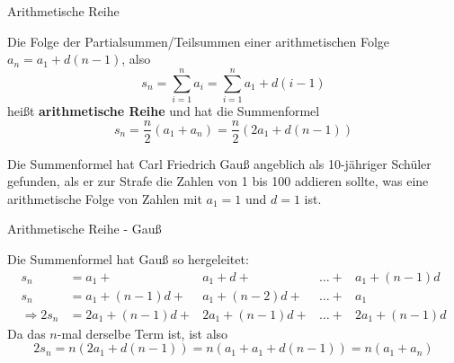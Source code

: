 \begin{frame}{Arithmetische  Reihe}
	\begin{definition}
		Die Folge der Partialsummen/Teilsummen einer arithmetischen Folge $a_{n} = a_{1} + d (n-1)$, also
		\[
			s_{n} = \sum_{i=1}^{n} a_{i} = \sum_{i=1}^{n} a_{1} + d (i-1)
		\]
		heißt \textbf{arithmetische Reihe} und hat die Summenformel
		\[
			s_{n} = \frac{n}{2}	\left( a_{1} + a_{n} \right) = \frac{n}{2} \left( 2 a_{1} + d (n-1)  \right)
		\]
	\end{definition}
	\begin{bemerkung}
		Die Summenformel hat Carl Friedrich Gauß angeblich als 10-jähriger Schüler gefunden, als er zur Strafe die Zahlen von 1 bis 100 addieren sollte, was eine arithmetische Folge von Zahlen mit $a_{1}=1$ und $d=1$ ist.
	\end{bemerkung}
\end{frame}

\begin{frame}{Arithmetische  Reihe - Gauß}
	\begin{example}
		Die Summenformel hat Gauß so hergeleitet:
		\begin{align*}	
			s_{n} & = a_1  +  & a_{1}  + d   + & \ldots  + & a_{1} + (n-1) d \\
			s_{n} & = a_{1} + (n-1) d  + & a_{1} + (n-2)d    + & \ldots  + & a_{1} \\ 
			\hline
			\Rightarrow 2 s_{n} & = 2 a_{1} + (n-1) d + & 2 a_{1} + (n-1) d + & \ldots + & 2 a_{1} + (n-1) d
		\end{align*}
		Da das $n$-mal derselbe Term ist, ist also
		\[	
			2s_{n} = n \left( 2a_{1} + d(n-1) \right) = n \left( a_{1} + a_{1} + d(n-1) \right) = n \left( a_{1} + a_{n} \right)
		\]
	\end{example}
\end{frame}	


